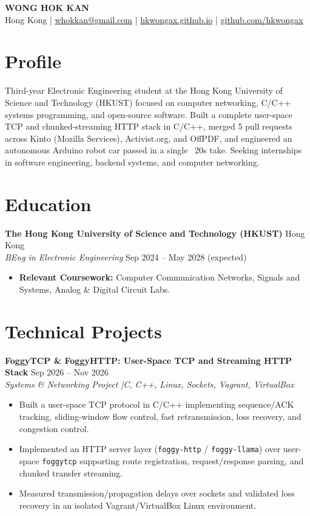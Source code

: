 \documentclass[10pt,a4paper]{article}
\begin{document}
\begin{center}
  {\LARGE\bfseries WONG HOK KAN}\\[3pt]
  {\small\color{muted}
    Hong Kong \enspace|\enspace
    \href{mailto:whokkan@gmail.com}{whokkan@gmail.com} \enspace|\enspace
    \href{https://hkwongax.github.io/}{hkwongax.github.io} \enspace|\enspace
    \href{https://github.com/hkwongax}{github.com/hkwongax}
  }
\end{center}
\vspace{1pt}

\section{Profile}
Third-year Electronic Engineering student at the Hong Kong University of Science and Technology (HKUST) focused on computer networking, C/C++ systems programming, and open-source software. Built a complete user-space TCP and chunked-streaming HTTP stack in C/C++, merged 5 pull requests across Kinto (Mozilla Services), Activist.org, and OffPDF, and engineered an autonomous Arduino robot car passed in a single ~20s take. Seeking internships in software engineering, backend systems, and computer networking.

\section{Education}
\textbf{The Hong Kong University of Science and Technology (HKUST)} \hfill Hong Kong\\
\textit{BEng in Electronic Engineering} \hfill Sep 2024 -- May 2028 (expected)
\begin{itemize}
  \item \textbf{Relevant Coursework:} Computer Communication Networks, Signals and Systems, Analog \& Digital Circuit Labs.
\end{itemize}

\section{Technical Projects}
\textbf{FoggyTCP \& FoggyHTTP: User-Space TCP and Streaming HTTP Stack} \hfill Sep 2026 -- Nov 2026\\
\textit{Systems \& Networking Project \enspace|\enspace C, C++, Linux, Sockets, Vagrant, VirtualBox}
\begin{itemize}
  \item Built a user-space TCP protocol in C/C++ implementing sequence/ACK tracking, sliding-window flow control, fast retransmission, loss recovery, and congestion control.
  \item Implemented an HTTP server layer (\texttt{foggy-http} / \texttt{foggy-llama}) over user-space \texttt{foggytcp} supporting route registration, request/response parsing, and chunked transfer streaming.
  \item Measured transmission/propagation delays over sockets and validated loss recovery in an isolated Vagrant/VirtualBox Linux environment.
\end{itemize}
\vspace{3pt}
\end{document}
